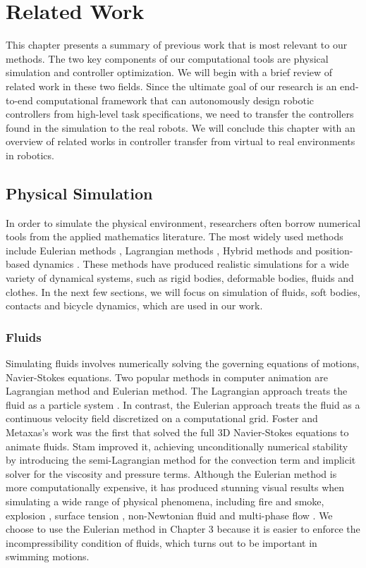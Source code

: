 \chapter{Related Work}

This chapter presents a summary of previous work that is most relevant to our methods. The two key components of our computational tools are physical simulation and controller optimization. We will begin with a brief review of related work in these two fields. Since the ultimate goal of our research is an end-to-end computational framework that can autonomously design robotic controllers from high-level task specifications, we need to transfer the controllers found in the simulation to the real robots. We will conclude this chapter with an overview of related works in controller transfer from virtual to real environments in robotics.

\section{Physical Simulation}
In order to simulate the physical environment, researchers often borrow numerical tools from the applied mathematics literature. The most widely used methods include Eulerian methods \cite{Foster:1996,stam99stablefluids}, Lagrangian methods \cite{Premzoe03,Muller:2003}, Hybrid methods \cite{Fan:2013} and position-based dynamics \cite{Muller:2007,Macklin:2014}. These methods have produced realistic simulations for a wide variety of dynamical systems, such as rigid bodies, deformable bodies, fluids and clothes. In the next few sections, we will focus on simulation of fluids, soft bodies, contacts and bicycle dynamics, which are used in our work.

\subsection{Fluids}

Simulating fluids involves numerically solving the governing equations of motions, Navier-Stokes equations. Two popular methods in computer animation are Lagrangian method and Eulerian method. The Lagrangian approach treats the fluid as a particle system \cite{Monaghan:1992,Premzoe03,Muller:2003,Raveendran:2011}. In contrast, the Eulerian approach treats the fluid as a continuous velocity field discretized
on a computational grid. Foster and Metaxas's work \cite{Foster:1996} was the first that
solved the full 3D Navier-Stokes equations to animate fluids.
Stam \cite{stam99stablefluids} improved it, achieving unconditionally
numerical stability by introducing the semi-Lagrangian
method for the convection term and implicit solver for
the viscosity and pressure terms. Although the Eulerian method is more computationally expensive, it has produced stunning visual results when simulating a wide range of physical phenomena, including fire and smoke\cite{Nguyen:2002,Fedkiw:2001}, explosion \cite{Yngve:2000}, surface tension \cite{Hong:2005,Wang:2005}, non-Newtonian fluid \cite{Goktekin:2004,Bargteil:2007} and multi-phase flow \cite{Losasso:2006,Ando:2015}. We choose to use the Eulerian method in Chapter 3 because it is easier to enforce the incompressibility condition of fluids, which turns out to be important in swimming motions. 

